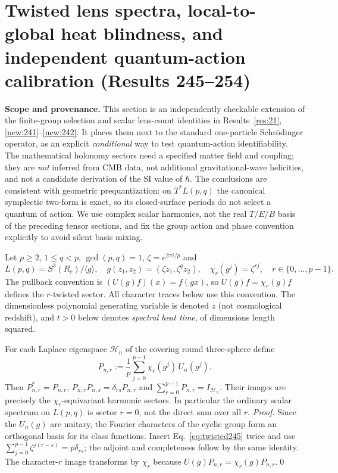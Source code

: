\section{Twisted lens spectra, local-to-global heat blindness, and independent quantum-action calibration (Results 245--254)}\label{sec:twisted-action-calibration}
\noindent\textbf{Scope and provenance.} This section is an independently checkable extension of the finite-group selection and scalar lens-count identities in Results~\ref{res:21}, \ref{new:241}--\ref{new:242}. It places them next to the standard one-particle Schr\"odinger operator, as an explicit \emph{conditional} way to test quantum-action identifiability. The mathematical holonomy sectors need a specified matter field and coupling; they are \emph{not} inferred from CMB data, not additional gravitational-wave helicities, and not a candidate derivation of the SI value of $\hbar$. The conclusions are consistent with geometric prequantization: on $T^*L(p,q)$ the canonical symplectic two-form is exact, so its closed-surface periods do not select a quantum of action. We use complex scalar harmonics, not the real $T/E/B$ basis of the preceding tensor sections, and fix the group action and phase convention explicitly to avoid silent basis mixing.

Let $p\ge2$, $1\le q<p$, $\gcd(p,q)=1$, $\zeta=e^{2\pi i/p}$ and
\begin{equation}\label{eq:twisted-lens-def}
 L(p,q)=S^3(R_c)/\langle g\rangle,\quad g(z_1,z_2)=(\zeta z_1,\zeta^qz_2),\quad \chi_r(g^j)=\zeta^{rj},\quad r\in\{0,\ldots,p-1\}.
\end{equation}
The pullback convention is $(U(g)f)(x)=f(gx)$, so $U(g)f=\chi_r(g)f$ defines the $r$-twisted sector. All character traces below use this convention. The dimensionless polynomial generating variable is denoted $z$ (not cosmological redshift), and $t>0$ below denotes \emph{spectral heat time}, of dimensions length squared.

\begin{result}\label{new:245}
For each Laplace eigenspace $\mathcal H_n$ of the covering round three-sphere define
\begin{equation}\label{eq:twisted245}
 P_{n,r}:=\frac1p\sum_{j=0}^{p-1}\overline{\chi_r(g^j)}\,U_n(g^j).
\end{equation}
Then $P_{n,r}^*=P_{n,r}$, $P_{n,r}P_{n,s}=\delta_{rs}P_{n,r}$ and $\sum_{r=0}^{p-1}P_{n,r}=I_{\mathcal H_n}$. Their images are precisely the $\chi_r$-equivariant harmonic sectors. In particular the ordinary scalar spectrum on $L(p,q)$ is sector $r=0$, not the direct sum over all $r$.
\textit{Proof.} Since the $U_n(g)$ are unitary, the Fourier characters of the cyclic group form an orthogonal basis for its class functions. Insert Eq.~\eqref{eq:twisted245} twice and use $\sum_{j=0}^{p-1}\zeta^{j(r-s)}=p\delta_{rs}$; the adjoint and completeness follow by the same identity. The character-$r$ image transforms by $\chi_r$ because $U(g)P_{n,r}=\chi_r(g)P_{n,r}$.\qed
\end{result}

